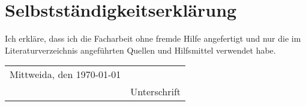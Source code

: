 
\chapter*{Selbstst\"{a}ndigkeitserkl\"{a}rung}
Ich erkl\"{a}re, dass ich die Facharbeit ohne fremde Hilfe angefertigt und nur die im Literaturverzeichnis angef\"{u}hrten Quellen und Hilfsmittel verwendet habe.
\vspace{1cm}

\begin{tabular}{lp{4.8cm}}
Mittweida, den \today & \dotfill                     \\
                          & Unterschrift
\end{tabular}
\thispagestyle{empty}